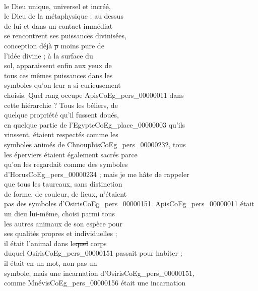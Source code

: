 \documentclass{book}
\begin{document}
{\begin{paracol}{2}
\noindent \\
\switchcolumn
\noindent le Dieu unique, universel et incréé,\\
le Dieu de la métaphysique ; au dessus\\
de lui et dans un contact immédiat\\
se rencontrent ses puissances divinisées,\\
conception déjà \sout{p} moins pure de\\
l’idée divine ; à la surface du\\
sol, apparaissent enfin aux yeux de\\
tous ces mêmes puissances dans les\\
symboles qu’on leur a si curieusement\\
choisis. Quel rang occupe Apis\gls{CoEg_pers_00000011} dans\\
cette hiérarchie ? Tous les béliers, de\\
quelque propriété qu’il fussent doués,\\
en quelque partie de l’Egypte\gls{CoEg_place_00000003} qu’ils\\
vinssent, étaient respectés comme les\\
symboles animés de Chnouphis\gls{CoEg_pers_00000232}, tous\\
les éperviers étaient également sacrés parce\\
qu’on les regardait comme des symboles\\
d’Horus\gls{CoEg_pers_00000234} ; mais je me hâte de rappeler\\
que tous les taureaux, sans distinction\\
de forme, de couleur, de lieux, n’étaient\\
pas des symboles d’Osiris\gls{CoEg_pers_00000151}. Apis\gls{CoEg_pers_00000011} était\\
un dieu lui-même, choisi parmi tous\\
les autres animaux de son espèce pour\\
ses qualités propres et individuelles ;\\
il était l’animal dans le\sout{quel} corps\\
duquel Osiris\gls{CoEg_pers_00000151} passait pour habiter ;\\
il était en un mot, non pas un\\
symbole, mais une incarnation d’Osiris\gls{CoEg_pers_00000151},\\
comme Mnévis\gls{CoEg_pers_00000156} était une incarnation\\

\end{paracol}}
\end{document}
